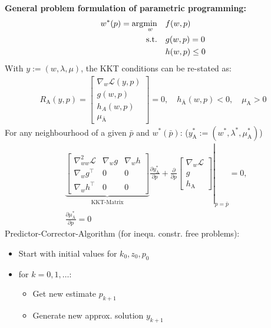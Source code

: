 \begin{tcolorbox}[colback=violet!5!white, %
  colframe=violet!75!black, %
  title=\textbf{Parametric Nonlinear Optimization}]
  \textbf{General problem formulation of parametric programming:}
  \begin{align*}
    w^*(p)=\arg\!\min_w \quad&f(w,p) \\
    \text{s.t.}\quad & g(w,p)=0 \\
    & h(w,p) \le 0
  \end{align*}
  With $y:=(w,\lambda,\mu)$, the KKT conditions can be re-stated as:
  \begin{align*}
    R_\text{A}(y,p)=
    \left[
    \begin{array}{c}
      \nabla_w \mathcal{L}(y,p) \\
      g(w,p) \\
      h_A(w,p) \\
      \mu_{\bar{\text{A}}}
    \end{array}
    \right] = 0,\quad h_{\bar{\text{A}}}(w,p) < 0,\quad \mu_\text{A} > 0
  \end{align*}
  For any neighbourhood of a given $\bar{p}$ and $w^*(\bar{p})$:
  ($y^*_\text{A}:=(w^*,\lambda^*, \mu^*_{\text{A}})$)
  \begin{align*}
    &\left.\underbrace{\left[\begin{array}{ccc}
            \nabla^2_{ww}\mathcal{L}&\nabla_w g&\nabla_w h \\
            \nabla_w g^\top& 0 & 0 \\
            \nabla_w h^\top& 0 & 0
          \end{array}\right]}_{\text{KKT-Matrix}}
                                 \frac{\partial y_\text{A}^*}{\partial p} +
                                 \frac{\partial}{\partial p}
                                 \left[
                                 \begin{array}{c}
                                   \nabla_w \mathcal{L} \\
                                   g \\
                                   h_\text{A}
                                 \end{array}
    \right]\right|_{p=\bar{p}} = 0,\\
    &\frac{\partial\mu^*_{\bar{\text{A}}}}{\partial p} = 0
  \end{align*}
  Predictor-Corrector-Algorithm (for inequ. constr. free problems):
  \begin{itemize}
  \item Start with initial values for $k_0, z_0, p_0$
  \item for $k=0,1,\dots$:
    \begin{itemize}
    \item Get new estimate $p_{k+1}$
    \item Generate new approx. solution $y_{k+1}$
    \end{itemize}


\end{itemize}
\end{tcolorbox}
